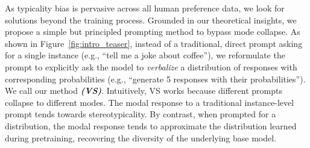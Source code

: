  As typicality bias is pervasive across all human preference data, we look for solutions beyond the training process. 
 Grounded in our theoretical insights, we %
 propose a simple but principled prompting method to bypass mode collapse. 
As shown in Figure~\ref{fig:intro_teaser},  instead of a traditional, direct prompt asking for a single instance (e.g., ``tell me a joke about coffee''), we reformulate the prompt to explicitly ask the model to \emph{verbalize} a distribution of responses with corresponding probabilities (e.g., ``generate 5 responses with their probabilities''). We call our method \textbf{\textit{\ours} \textit{(VS)}}. 
Intuitively, VS works because different prompts collapse to different modes. The modal response to a traditional instance-level prompt tends towards stereotypicality. By contrast, when prompted for a distribution, the modal response tends to approximate the distribution learned during pretraining, recovering the diversity of the underlying base model. 
%


